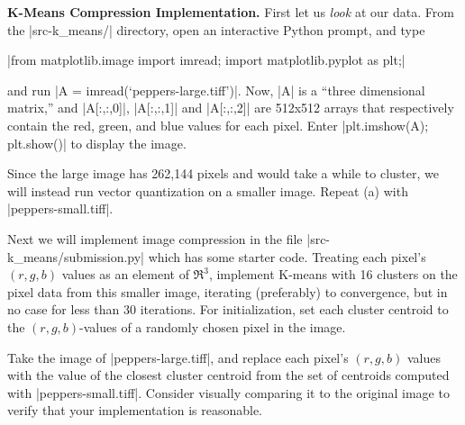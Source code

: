 \item {}
\textbf{K-Means Compression Implementation.}
First let us \emph{look} at our data. From the |src-k_means/| directory, open an interactive Python prompt, and type
%
\begin{center}
  |from matplotlib.image import imread; import matplotlib.pyplot as plt;|
\end{center}
%
and run |A = imread(`peppers-large.tiff')|. Now, |A| is a ``three dimensional matrix,'' and |A[:,:,0]|, |A[:,:,1]| and |A[:,:,2]| are 512x512 arrays that respectively contain the red, green, and blue values for each pixel. Enter |plt.imshow(A); plt.show()| to display the image.

Since the large image has 262,144 pixels and would take a while to cluster, we will instead run vector quantization on a smaller image. Repeat (a) with |peppers-small.tiff|.


Next we will implement image compression in the file |src-k_means/submission.py| which has some starter code. Treating each pixel's $(r, g, b)$ values as an element of $\Re^3$, implement K-means with 16 clusters on the pixel data from this smaller image, iterating (preferably) to convergence, but in no case for less than 30 iterations. For initialization, set each cluster centroid to the $(r, g, b)$-values of a randomly chosen pixel in the image.

Take the image of |peppers-large.tiff|, and replace each pixel's $(r, g, b)$ values with the value of the closest cluster centroid from the set of centroids computed with |peppers-small.tiff|. Consider visually comparing it to the original image to verify that your implementation is reasonable.
